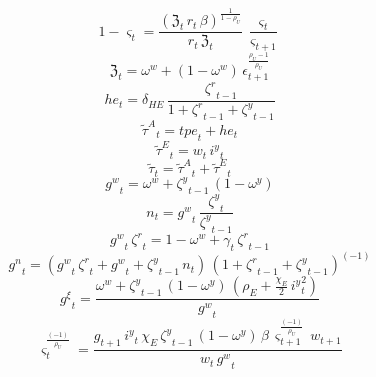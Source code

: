 \begin{dmath}
1-{{\varsigma}}_{t}=\frac{\left({{\mathfrak{Z}}}_{t}\, {{r}}_{t}\, {{\beta}}\right)^{\frac{1}{1-{{\rho_U}}}}}{{{r}}_{t}\, {{\mathfrak{Z}}}_{t}}\, \frac{{{\varsigma}}_{t}}{{{\varsigma}}_{t+1}}
\end{dmath}
\begin{dmath}
{{\mathfrak{Z}}}_{t}={{\omega^w}}+\left(1-{{\omega^w}}\right)\, {{\epsilon}}_{t+1}^{\frac{{{\rho_U}}-1}{{{\rho_U}}}}
\end{dmath}
\begin{dmath}
{{he}}_{t}={{\delta_{HE}}}\, \frac{{{\zeta^{r}}}_{t-1}}{1+{{\zeta^{r}}}_{t-1}+{{\zeta^{y}}}_{t-1}}
\end{dmath}
\begin{dmath}
{\tilde{\tau}^A}_{t}={{tpe}}_{t}+{{he}}_{t}
\end{dmath}
\begin{dmath}
{\tilde{\tau}^E}_{t}={{w}}_{t}\, {{i^y}}_{t}
\end{dmath}
\begin{dmath}
{\tilde{\tau}}_{t}={\tilde{\tau}^A}_{t}+{\tilde{\tau}^E}_{t}
\end{dmath}
\begin{dmath}
{{g^w}}_{t}={{\omega^w}}+{{\zeta^{y}}}_{t-1}\, \left(1-{{\omega^{y}}}\right)
\end{dmath}
\begin{dmath}
{{n}}_{t}={{g^w}}_{t}\, \frac{{{\zeta^{y}}}_{t}}{{{\zeta^{y}}}_{t-1}}
\end{dmath}
\begin{dmath}
{{g^w}}_{t}\, {{\zeta^{r}}}_{t}=1-{{\omega^w}}+{{\gamma}}_{t}\, {{\zeta^{r}}}_{t-1}
\end{dmath}
\begin{dmath}
{{g^n}}_{t}=\left({{g^w}}_{t}\, {{\zeta^{r}}}_{t}+{{g^w}}_{t}+{{\zeta^{y}}}_{t-1}\, {{n}}_{t}\right)\, \left(1+{{\zeta^{r}}}_{t-1}+{{\zeta^{y}}}_{t-1}\right)^{\left(-1\right)}
\end{dmath}
\begin{dmath}
{{g^{\xi}}}_{t}=\frac{{{\omega^w}}+{{\zeta^{y}}}_{t-1}\, \left(1-{{\omega^{y}}}\right)\, \left({{\rho_E}}+\frac{{{\chi_E}}}{2}\, {{i^y}}_{t}^{2}\right)}{{{g^w}}_{t}}
\end{dmath}
\begin{dmath}
{{\varsigma}}_{t}^{\frac{\left(-1\right)}{{{\rho_U}}}}=\frac{{{g}}_{t+1}\, {{i^y}}_{t}\, {{\chi_E}}\, {{\zeta^{y}}}_{t-1}\, \left(1-{{\omega^{y}}}\right)\, {{\beta}}\, {{\varsigma}}_{t+1}^{\frac{\left(-1\right)}{{{\rho_U}}}}\, {{w}}_{t+1}}{{{w}}_{t}\, {{g^w}}_{t}}
\end{dmath}
